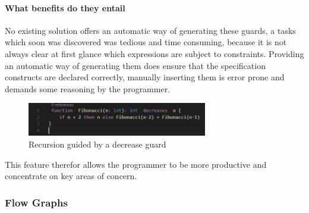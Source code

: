 \paragraph{What benefits do they entail}
No existing solution offers an automatic way of generating these guards, a tasks which soon was discovered was tedious and time consuming, because it is not always clear at first glance which expressions are subject to constraints. Providing an automatic way of generating them does ensure that the specification constructs are declared correctly, manually inserting them is error prone and demands some reasoning by the programmer.  \newline
\begin{figure}[H]
	\centering
	\includegraphics[width=0.7\textwidth]{img/decreaseGuardApplied}
	\caption{Recursion guided by a decrease guard}
	\label{fig:dfdecreaseguardapplied}
\end{figure}
This feature therefor allows the programmer to be more productive and concentrate on key areas of concern.
\subsubsection{Flow Graphs}
